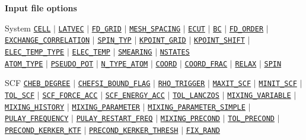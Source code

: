 \begin{frame}[allowframebreaks]{\textbf{Input file options}} \label{Index}
\vspace{-2mm}
\begin{block}{System}
\hyperlink{CELL}{\texttt{CELL}} $\vert$ \hyperlink{LATVEC}{\texttt{LATVEC}}  $\vert$ \hyperlink{FD_GRID}{\texttt{FD\_GRID}} $\vert$ \hyperlink{MESH_SPACING}{\texttt{MESH\_SPACING}} $\vert$ \hyperlink{ECUT}{\texttt{ECUT}} $\vert$ \hyperlink{BC}{\texttt{BC}} $\vert$ \hyperlink{FD_ORDER}{\texttt{FD\_ORDER}} $\vert$ \hyperlink{EXCHANGE_CORRELATION}{\texttt{EXCHANGE\_CORRELATION}} $\vert$ \hyperlink{SPIN_TYP}{\texttt{SPIN\_TYP}} $\vert$ \hyperlink{KPOINT_GRID}{\texttt{KPOINT\_GRID}} $\vert$ \hyperlink{KPOINT_SHIFT}{\texttt{KPOINT\_SHIFT}} $\vert$ \hyperlink{ELEC_TEMP_TYPE}{\texttt{ELEC\_TEMP\_TYPE}} $\vert$ \hyperlink{ELEC_TEMP}{\texttt{ELEC\_TEMP}} $\vert$ \hyperlink{SMEARING}{\texttt{SMEARING}} $\vert$ \hyperlink{NSTATES}{\texttt{NSTATES}} \\
\hyperlink{ATOM_TYPE}{\texttt{ATOM\_TYPE}} $\vert$ \hyperlink{PSEUDO_POT}{\texttt{PSEUDO\_POT}}  $\vert$ \hyperlink{N_TYPE_ATOM}{\texttt{N\_TYPE\_ATOM}} $\vert$ \hyperlink{COORD}{\texttt{COORD}} $\vert$ \hyperlink{COORD_FRAC}{\texttt{COORD\_FRAC}} $\vert$ \hyperlink{RELAX}{\texttt{RELAX}} $\vert$ \hyperlink{SPIN}{\texttt{SPIN}} 
\end{block}

\begin{block}{SCF}
\hyperlink{CHEB_DEGREE}{\texttt{CHEB\_DEGREE}} $\vert$ \hyperlink{CHEFSI_BOUND_FLAG}{\texttt{CHEFSI\_BOUND\_FLAG}} $\vert$ \hyperlink{RHO_TRIGGER}{\texttt{RHO\_TRIGGER}} $\vert$ \hyperlink{MAXIT_SCF}{\texttt{MAXIT\_SCF}} $\vert$ \hyperlink{MINIT_SCF}{\texttt{MINIT\_SCF}} $\vert$ \hyperlink{TOL_SCF}{\texttt{TOL\_SCF}} $\vert$ \hyperlink{SCF_FORCE_ACC}{\texttt{SCF\_FORCE\_ACC}} $\vert$ \hyperlink{SCF_ENERGY_ACC}{\texttt{SCF\_ENERGY\_ACC}} $\vert$ \hyperlink{TOL_LANCZOS}{\texttt{TOL\_LANCZOS}} $\vert$ \hyperlink{MIXING_VARIABLE}{\texttt{MIXING\_VARIABLE}} $\vert$ \hyperlink{MIXING_HISTORY}{\texttt{MIXING\_HISTORY}} $\vert$ \hyperlink{MIXING_PARAMETER}{\texttt{MIXING\_PARAMETER}} $\vert$ \hyperlink{MIXING_PARAMETER_SIMPLE}{\texttt{MIXING\_PARAMETER\_SIMPLE}} $\vert$ \hyperlink{PULAY_FREQUENCY}{\texttt{PULAY\_FREQUENCY}} $\vert$ \hyperlink{PULAY_RESTART_FREQ}{\texttt{PULAY\_RESTART\_FREQ}} $\vert$ \hyperlink{MIXING_PRECOND}{\texttt{MIXING\_PRECOND}} $\vert$ \hyperlink{TOL_PRECOND}{\texttt{TOL\_PRECOND}} $\vert$ \hyperlink{PRECOND_KERKER_KTF}{\texttt{PRECOND\_KERKER\_KTF}} $\vert$ \hyperlink{PRECOND_KERKER_THRESH}{\texttt{PRECOND\_KERKER\_THRESH}} $\vert$ \hyperlink{FIX_RAND}{\texttt{FIX\_RAND}}
\end{block}


\end{frame}

